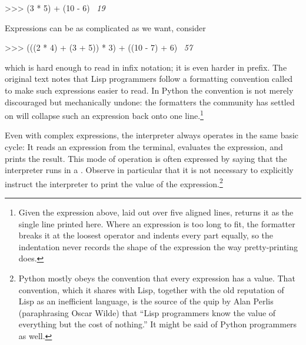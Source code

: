 \begin{codeBlock}
>>> (3 * 5) + (10 - 6)
~\textit{19}~
\end{codeBlock}

\noindent
Expressions can be as complicated as we want, consider

\begin{codeBlock}
>>> (((2 * 4) + (3 + 5)) * 3) + ((10 - 7) + 6)
~\textit{57}~
\end{codeBlock}

\noindent
which is hard enough to read in infix notation; it is even harder in prefix. The
original text notes that Lisp programmers follow a formatting convention called
 to make such expressions easier to read. In Python the
convention is not merely discouraged but mechanically undone: the formatters the
community has settled on will collapse such an expression back onto one
line.\footnote{Given the expression above, laid out over five aligned lines,
 returns it as the single line printed here. Where an
expression is too long to fit, the formatter breaks it at the loosest operator
and indents every part equally, so the indentation never records the shape of
the expression the way pretty-printing does.}

Even with complex expressions, the interpreter always operates in the same
basic cycle: It reads an expression from the terminal, evaluates the
expression, and prints the result.  This mode of operation is often expressed
by saying that the interpreter runs in a .
Observe in particular that it is not necessary to explicitly instruct the
interpreter to print the value of the expression.\footnote{Python mostly obeys
the convention that every expression has a value. That convention, which it
shares with Lisp, together with the old reputation of Lisp as an inefficient
language, is the source of the quip by Alan Perlis (paraphrasing Oscar Wilde)
that ``Lisp
programmers know the value of everything but the cost of nothing.'' It might be
said of Python programmers as well.}
